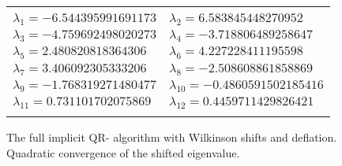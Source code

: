 \documentclass[a4paper,8pt]{beamer} %
\begin{document}
\begin{frame}
\begin{columns}
\begin{figure}
\begin{center}
\begin{scriptsize}
	\begin{tabular}{ll}
		\hline
		\hline
		\\
		$\lambda_1=
		-6.544395991691173
		$ & $\lambda_2=
		6.583845448270952
		$ \\ $\lambda_3=
		-4.759692498020273
		$ & $\lambda_4=
		-3.718806489258647
		$ \\ $\lambda_5=
		2.480820818364306
		$ & $\lambda_6=
		4.227228411195598
		$ \\ $\lambda_7=
		3.406092305333206
		$ & $\lambda_8=
		-2.508608861858869
		$ \\ $\lambda_9=
		-1.768319271480477
		$ & $\lambda_{10}=
		-0.4860591502185416
		$ \\ $\lambda_{11}=
		0.731101702075869
		$ & $\lambda_{12}=
		0.4459711429826421
		$ \\
		\\
		\hline
		\hline
	\end{tabular}
	\end{scriptsize}
\caption{
	The full implicit QR- algorithm with Wilkinson shifts and deflation. Quadratic convergence
	of the shifted eigenvalue. 
}
\end{center}
\end{figure}
%
%
%
\end{columns}
\end{frame}%
\end{document}
